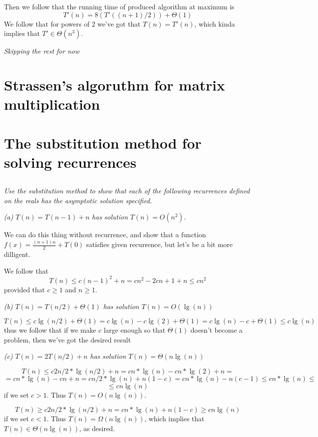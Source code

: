 \documentclass[11pt,oneside,titlepage]{book}
\begin{document}
Then we follow that the running time of produced algorithm at maximum is
$$T'(n) = 8 (T'((n + 1) / 2)) + \Theta(1)$$
We follow that for powers of $2$ we've got that $T(n) = T'(n)$, which kinda implies that
$T' \in \Theta(n^3)$.

\textit{Skipping the rest for now}

\section{Strassen's algoruthm for matrix multiplication}

\section{The substitution method for solving recurrences}

\subsection{}

\textit{Use the substitution method to show that each of the following recurrences defined
  on the reals has the asymptotic solution specified.}

\textit{(a) $T(n) = T(n - 1) + n$ has solution $T(n) = O(n^2)$.}

We can do this thing without recurrence, and show that a function $f(x) = \frac{(n + 1)n}{2} + T(0)$
satisfies given recurrence, but let's be a bit more dilligent.

We follow that
$$T(n) \leq c (n - 1)^2 + n = cn^2 - 2cn + 1 + n \leq cn^2$$
provided that $c \geq 1$ and $n \geq 1$.

\textit{(b) $T(n) = T(n/2) + \Theta(1)$ has solution $T(n) = O(\lg(n))$}

$$T(n) \leq c \lg(n/2) + \Theta(1) =
c \lg(n) - c \lg(2) + \Theta(1) = c \lg(n) - c + \Theta(1) \leq c \lg(n)$$
thus we follow that if we make $c$ large enough so that $\Theta(1)$ doesn't become a problem, then
we've got the desired result

\textit{(c) $T(n) = 2T(n/2) + n$ has solution $T(n) = \Theta(n \lg(n))$}

$$T(n) \leq c 2  n / 2 * \lg(n/2) + n = c n * \lg(n) - c n * \lg(2) + n = $$
$$ = 
c n * \lg(n) - c n + n = c n/2 * \lg(n) + n (1 - c) =
c n * \lg(n) -  n (c - 1) \leq c n * \lg(n) \leq $$
$$ \leq c n \lg(n)$$
if we  set $c > 1$. Thus $T(n) = O(n \lg(n))$.

$$T(n) \geq c 2 n / 2 * \lg(n/2) + n = c n * \lg(n) +  n (1 - c) \geq c n \lg(n)$$
if we set $c < 1$. Thus $T(n) = \Omega(n \lg(n))$, which implies that $T(n) \in \Theta(n \lg(n))$,
as desired.
\end{document}

